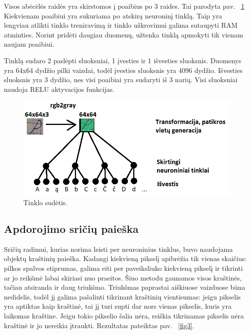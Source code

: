 \documentclass[conference]{IEEEtran}
\begin{document}
Visos abėcėlės raidės yra skirstomos į poaibius po 3 raides. Tai parodyta pav. ~\ref{fig1} Kiekvienam poaibiui yra
sukuriama po atskirą neuroninį tinklą. Taip yra lengviau atlikti tinklo treniravimą
ir tinklo užkrovimui galima sutaupyti RAM atminties. Norint pridėti daugiau
duomenų, užtenka tinklą apmokyti tik vienam naujam poaibiui.
\par
Tinklą sudaro 2 paslėpti sluoksniai, 1 įvesties ir 1 išvesties sluoksnis. Duomenys
yra 64x64 dydžio pilki vaizdai, todėl įvesties sluoksnis yra 4096 dydžio. Išvesties
sluoksnis yra 3 dydžio, nes visi poaibiai yra sudaryti iš 3 narių. Visi sluoksniai naudoja
RELU aktyvacijos funkcijas.

\begin{figure}[!h] %
\centerline{\includegraphics[scale=0.4] {images/1.png}}
\caption{Tinklo sudėtis.}
\label{fig1}
\end{figure}

\subsection{Apdorojimo sričių paieška}


Sričių radimui, kurias norima leisti per neuroninius tinklus, buvo naudojama
objektų kraštinių paieška. Kadangi kiekvieną pikselį apibrėžia tik vienas skaičius:
pilkos spalvos stiprumas, galima eiti per paveiksliuko kiekvieną pikselį ir
tikrinti ar jo reikšmė labai skiriasi nuo praeitos. Šiuo metodu gaunamos visos kraštinės,
tačiau atsiranda ir daug triukšmo. Triukšmas paprastai aiškiuose vaizduose būna nedidelis, todėl
jį galima pašalinti tikrinant kraštinių vientisumas: jeigu pikselis yra aptiktas kaip kraštinė,
tai jį turi supti dar nors vienas pikselis, kuris yra laikomas kraštine. Jeigu tokio pikselio šalia nėra,
reiškia tikrinamas pikselis nėra kraštinė ir jo nereikia įtraukti. Rezultatas pateiktas pav. ~\ref{fig3}.
\end{document}
